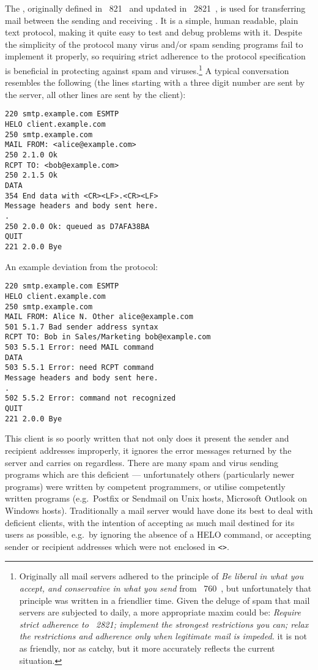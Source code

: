 The \SMTPlong{}, originally defined in \RFC{}~821~\cite{RFC821} and updated
in \RFC{}~2821~\cite{RFC2821}, is used for transferring mail between the
sending and receiving \MTA{}\@.  It is a simple, human readable, plain text
protocol, making it quite easy to test and debug problems with it.  Despite
the simplicity of the protocol many virus and/or spam sending programs fail
to implement it properly, so requiring strict adherence to the protocol
specification is beneficial in protecting against spam and
viruses.\footnote{\label{footnote:rfc760}Originally all mail servers
adhered to the principle of \textit{Be liberal in what you accept, and
conservative in what you send\/} from \RFC{}~760~\cite{rfc760}, but
unfortunately that principle was written in a friendlier time.  Given the
deluge of spam that mail servers are subjected to daily, a more appropriate
maxim could be: \textit{Require strict adherence to \RFC{}~2821; implement
the strongest restrictions you can; relax the restrictions and adherence
only when legitimate mail is impeded.\/}  it is not as friendly, nor as
catchy, but it more accurately reflects the current situation.} A typical
\SMTP{} conversation resembles the following (the lines starting with a
three digit number are sent by the server, all other lines are sent by the
client):

\begin{verbatim}
220 smtp.example.com ESMTP
HELO client.example.com
250 smtp.example.com
MAIL FROM: <alice@example.com>
250 2.1.0 Ok
RCPT TO: <bob@example.com>
250 2.1.5 Ok
DATA
354 End data with <CR><LF>.<CR><LF>
Message headers and body sent here.
.
250 2.0.0 Ok: queued as D7AFA38BA
QUIT
221 2.0.0 Bye
\end{verbatim}

An example deviation from the protocol:

\begin{verbatim}
220 smtp.example.com ESMTP
HELO client.example.com
250 smtp.example.com
MAIL FROM: Alice N. Other alice@example.com
501 5.1.7 Bad sender address syntax
RCPT TO: Bob in Sales/Marketing bob@example.com
503 5.5.1 Error: need MAIL command
DATA
503 5.5.1 Error: need RCPT command
Message headers and body sent here.
.
502 5.5.2 Error: command not recognized
QUIT
221 2.0.0 Bye
\end{verbatim}

This client is so poorly written that not only does it present the sender
and recipient addresses improperly, it ignores the error messages returned
by the server and carries on regardless.  There are many spam and virus
sending programs which are this deficient --- unfortunately others
(particularly newer programs) were written by competent programmers, or
utilise competently written programs (e.g.\ Postfix or Sendmail on Unix
hosts, Microsoft Outlook on Windows hosts).  Traditionally a mail server
would have done its best to deal with deficient clients, with the intention
of accepting as much mail destined for its users as
possible, e.g.\ by ignoring the absence of a HELO
command, or accepting sender or recipient addresses which were not enclosed
in \texttt{<>}.  

